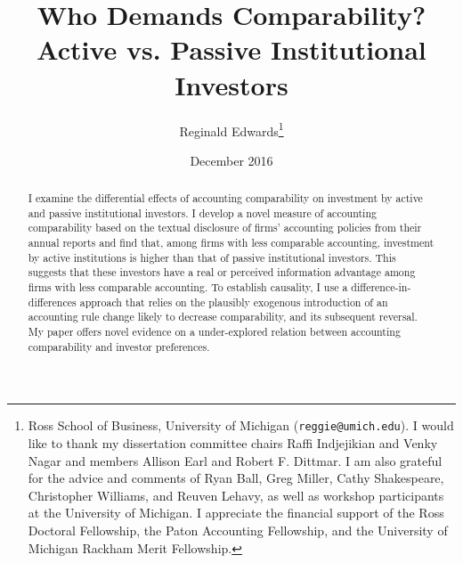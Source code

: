 \documentclass[12pt, letterpaper]{article}
\begin{document}
 

\title{Who Demands Comparability?\\Active vs. Passive Institutional Investors}
\author{Reginald Edwards\footnote{Ross School of Business, University of Michigan
(\texttt{reggie@umich.edu}). I would like to thank my dissertation committee chairs Raffi Indjejikian and Venky Nagar and members Allison Earl and Robert F. Dittmar. I am also grateful for the advice and comments of Ryan Ball, Greg Miller, Cathy Shakespeare, Christopher Williams, and Reuven Lehavy, as well as workshop participants at the University of Michigan. I appreciate the financial support of the Ross Doctoral Fellowship, the Paton Accounting Fellowship, and the University of Michigan Rackham Merit Fellowship.}} 
\date{December 2016}

\maketitle 
\begin{abstract} 
I examine the differential effects of accounting comparability on investment by active and passive institutional investors. I develop a novel measure of accounting comparability based on the textual disclosure of firms' accounting policies from their annual reports and find that, among firms with less comparable accounting, investment by active institutions is higher than that of passive institutional investors. This suggests that these investors have a real or perceived information advantage among firms with less comparable accounting. To establish causality, I use a difference-in-differences approach that relies on the plausibly exogenous introduction of an accounting rule change likely to decrease comparability, and its subsequent reversal. My paper offers novel evidence on a under-explored relation between accounting comparability and investor preferences.
\end{abstract}
\end{document}
